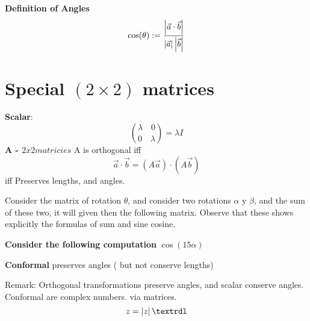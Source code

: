 \textbf{Definition of Angles }
\[ \cos(\theta) := \frac{\left| \vec{a} \cdot \vec{b} \right|}{\left| \vec{a} \right| \left|  \vec{b} \right|}\]

\section{Special $ (2 \times 2 ) $ matrices}

\textbf{Scalar}: 
\[ \binom{ \lambda \quad 0}{0 \quad \lambda } = \lambda I \]
\textbf{A - $ 2 x 2 matricies$}
A is orthogonal iff
\[ \vec{a} \cdot \vec{b} = (A \vec{a}) \cdot (A \vec{b}) \] iff
Preserves lengths, and angles.

Consider the matrix of rotation $ \theta $, and consider two rotations  $ \alpha $ y $ \beta $, and the sum of these two, it will given then the following matrix.
Observe that these shows explicitly the formulas of sum and sine cosine.

\textbf{Consider the following computation} $ \cos(15 \alpha) $

\begin{define}
	\textbf{Conformal} preserves angles ( but not conserve lengths)
\end{define}

Remark: Orthogonal transformations preserve angles, and scalar conserve angles.
Conformal are complex numbers. via matrices. 
\[ z = \abs{z} \textrdl \]